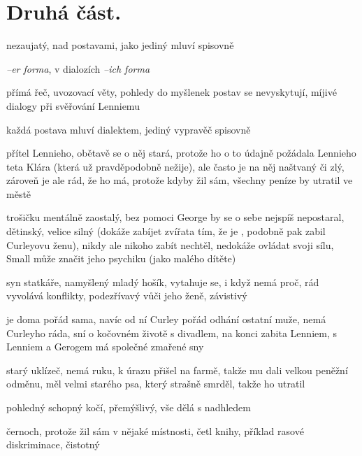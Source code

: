 \documentclass{article}
\begin{document}
\section{Druhá část.}
\begin{description}
    \setlength\itemsep{0.15em}
    \item[vypravěč:] nezaujatý, nad postavami, jako jediný mluví spisovně
    \item[vyprávěcí způsoby:] \textit{--er forma}, v dialozích \textit{--ich forma}
    \item[typy promluv:] přímá řeč, uvozovací věty, pohledy do myšlenek postav se nevyskytují, míjivé dialogy při svěřování Lenniemu
    \item[jazyková stránka:] každá postava mluví dialektem, jediný vypravěč spisovně
    \item[postavy:]
        \begin{description}
            \setlength\itemsep{0.15em}
            \item[George Milton,] přítel Lennieho, obětavě se o něj stará, protože ho o to údajně požádala Lennieho teta Klára (která už pravděpodobně nežije), ale často je na něj naštvaný či zlý, zároveň je ale rád, že ho má, protože kdyby žil sám, všechny peníze by utratil ve městě
            \item[Lennie Small,] trošičku mentálně zaostalý, bez pomoci George by se o sebe nejspíš nepostaral, dětinský, velice silný (dokáže zabíjet zvířata tím, že je , podobně pak zabil Curleyovu ženu), nikdy ale nikoho zabít nechtěl, nedokáže ovládat svoji sílu, Small může značit jeho psychiku (jako malého dítěte)
            \item[Curley,] syn statkáře, namyšlený mladý hošík, vytahuje se, i když nemá proč, rád vyvolává konflikty, podezřívavý vůči jeho ženě, závistivý
            \item[Curleyova žena,] je doma pořád sama, navíc od ní Curley pořád odhání ostatní muže, nemá Curleyho ráda, sní o kočovném životě s divadlem, na konci zabita Lenniem, s Lenniem a Gerogem má společné zmařené sny
            \item[Candy,] starý uklízeč, nemá ruku, k úrazu přišel na farmě, takže mu dali velkou peněžní odměnu, měl velmi starého psa, který strašně smrděl, takže ho utratil
            \item[Slim,] pohledný schopný kočí, přemýšlivý, vše dělá s nadhledem
            \item[Crooks,] černoch, protože žil sám v nějaké místnosti, četl knihy, příklad rasové diskriminace, čistotný

\end{description}
\end{description}
\end{document}
